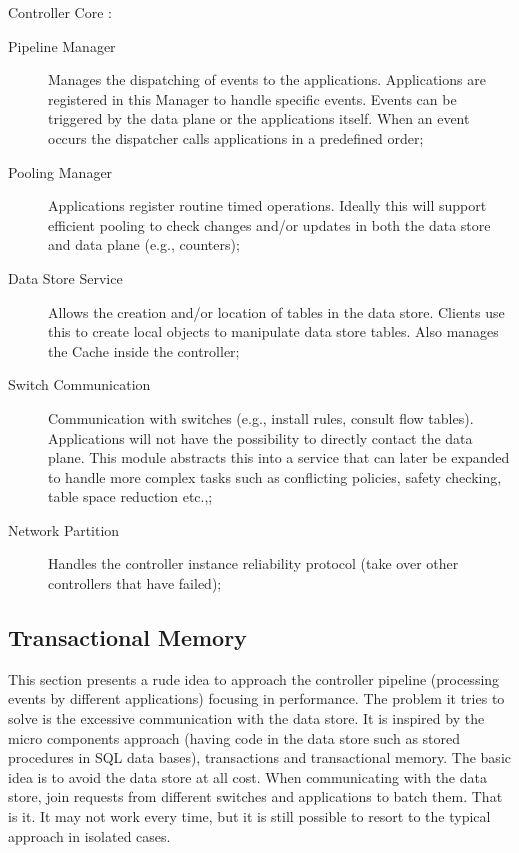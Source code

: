 Controller Core : 

\begin{description}
  \item[Pipeline Manager] Manages the dispatching of  events to the applications. Applications are registered in this Manager to handle specific events. Events can be triggered by the data plane or the applications itself. When an event  occurs the dispatcher calls applications in a predefined order;
  \item[Pooling Manager] Applications register routine timed operations. Ideally this will support efficient pooling to check changes and/or updates in both the data store and data plane (e.g., counters); 
  \item[Data Store Service] Allows the creation and/or location of tables in the data store. Clients use this to create local objects to manipulate data store tables. Also manages the Cache inside the controller; 
  \item[Switch Communication] Communication with switches (e.g., install rules, consult flow tables). Applications will not have the possibility to directly contact the data plane. This module abstracts this into a service that can later be expanded to handle more complex tasks such as conflicting policies, safety checking, table space reduction etc.,; 
  \item[Network Partition] Handles the controller instance reliability protocol (take over other controllers that have failed);
\end{description}



\subsection{Transactional Memory}

This section presents a rude idea to approach the controller pipeline (processing events by different applications) focusing in performance. The problem it tries to solve is the excessive communication with the data store. 
It is inspired by the micro components approach (having code in the data store such as stored procedures in SQL data bases), transactions and transactional memory. The basic idea is to avoid the data store at all cost. When communicating with the data store, join requests from different switches and applications to batch them. That is it. It may not work every time, but it is still possible to resort to the typical approach in isolated cases.\\


